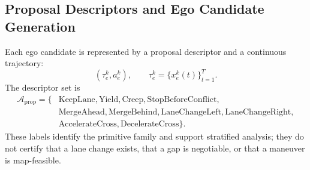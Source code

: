 \documentclass[10pt]{article}
\begin{document}
\subsection{Proposal Descriptors and Ego Candidate Generation}
\label{app:ego_candidates}

Each ego candidate is represented by a proposal descriptor and a continuous trajectory:
\begin{equation}
    (\tau^k_e,a^k_e), \qquad
    \tau^k_e=\{x^k_e(t)\}_{t=1}^{T}.
\end{equation}
The descriptor set is
\begin{equation}
\begin{aligned}
    \mathcal{A}_{\mathrm{prop}}
    =
    \{
    &\mathrm{KeepLane},
    \mathrm{Yield},
    \mathrm{Creep},
    \mathrm{StopBeforeConflict},\\
    &\mathrm{MergeAhead},
    \mathrm{MergeBehind},
    \mathrm{LaneChangeLeft},
    \mathrm{LaneChangeRight},\\
    &\mathrm{AccelerateCross},
    \mathrm{DecelerateCross}
    \}.
\end{aligned}
\end{equation}
These labels identify the primitive family and support stratified analysis; they do not certify that a lane change exists, that a gap is negotiable, or that a maneuver is map-feasible.
\end{document}
